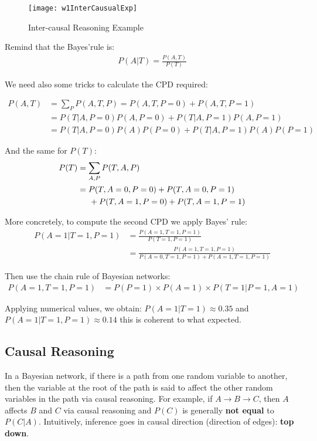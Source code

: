 \begin{figure}[!ht]
	\centering
	\texttt{[image: w1InterCausualExp]}
	\caption{Inter-causal Reasoning Example}
	\label{w1InterCausualExp}
\end{figure}
 
Remind that the Bayes'rule is:
\begin{align*}
P(A|T) = \frac{P(A,T)}{P(T)}
\end{align*}

We need also some tricks to calculate the CPD required:

\begin{align*}
P(A, T) &= \sum_{P}P(A, T, P) = P(A, T, P=0) + P(A, T, P=1) \\
		&= P(T | A, P=0)P(A, P=0) + P(T | A, P=1)P(A, P=1) \\
		&= P(T | A, P=0)P(A)P(P=0) + P(T | A, P=1)P(A)P(P=1)
\end{align*}

And the same for $P(T)$:
\begin{align*}
P(T) 	&= \sum_{A, P}P(T, A, P) \\ 
		&= P(T, A = 0, P = 0) + P(T, A = 0, P = 1) \\ 
		& \hspace{0.5cm} + P(T, A = 1, P = 0) + P(T, A = 1, P = 1)
\end{align*}

More concretely, to compute the second CPD we apply Bayes' rule:
\begin{align} 
P(A = 1 | T = 1, P = 1) &= \frac{P(A = 1, T = 1, P = 1)}{P(T = 1, P = 1)} \\ &= \frac{P(A = 1, T = 1, P = 1)}{P(A = 0, T = 1, P = 1) + P(A = 1, T = 1, P = 1)} 
\end{align}

Then use the chain rule of Bayesian networks:
\begin{align} 
P(A = 1, T = 1, P = 1) &= P(P = 1) \times P(A = 1) \times P(T = 1 | P = 1, A = 1)
\end{align}

Applying numerical values, we obtain: $P( A = 1 | T = 1) \approx 0.35$ and $P(A = 1 | T = 1, P = 1) \approx 0.14$ this is coherent to what expected.


\subsection{Causal Reasoning}
In a Bayesian network, if there is a path from one random variable to another, then the variable at the root of the path is said to affect the other random variables in the path via causal reasoning. For example, if $A \rightarrow B \rightarrow C$, then $A$ affects $B$ and $C$ via causal reasoning and $P(C)$ is generally \textbf{not equal} to $P(C|A)$.
Intuitively, inference goes in causal direction (direction of edges): \textbf{top down}.

